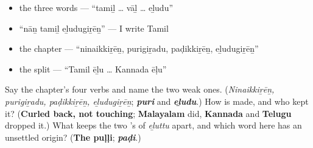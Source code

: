 \begin{itemize}
\raggedright
  \item the three  words — \textquotedblleft{}tamiḻ … vāḻ … eḻudu\textquotedblright{}
  \item \textquotedblleft{}nāṉ tamiḻ eḻudugiṟēṉ\textquotedblright{} — I write Tamil
  \item the chapter — \textquotedblleft{}ninaikkiṟēṉ, purigiṟadu, paḍikkiṟēṉ, eḻudugiṟēṉ\textquotedblright{}
  \item the split — \textquotedblleft{}Tamil ēḻu … Kannada ēḷu\textquotedblright{}
\end{itemize}

\begin{tcolorbox}[breakable,colback=teal!4,colframe=teal!35!black,title={Before you move on}]
Say the chapter's four verbs and name the two weak ones. (\emph{Ninaikkiṟēṉ, purigiṟadu, paḍikkiṟēṉ, eḻudugiṟēṉ}; \emph{\textbf{puri}} and \emph{\textbf{eḻudu}}.) How is \textbf{} made, and who kept it? (\textbf{Curled back, not touching}; \textbf{Malayalam} did, \textbf{Kannada} and \textbf{Telugu} dropped it.) What keeps the two \textbf{}'s of \emph{eḻuttu} apart, and which word here has an unsettled origin? (\textbf{The puḷḷi}; \emph{\textbf{paḍi}}.)
\end{tcolorbox}
